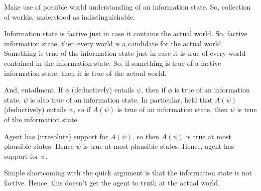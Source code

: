 \documentclass[10pt]{article}
\begin{document}
\begin{note}
  Make use of possible world understanding of an information state.
  So, collection of worlds, understood as indistinguishable.

  Information state is factive just in case it contains the actual world.
  So, factive information state, then every world is a candidate for the actual world.
  Something is true of the information state just in case it is true of every world contained in the information state.
  So, if something is true of a factive information state, then it is true of the actual world.

  And, entailment.
  If \(\phi\) (deductively) entails \(\psi\), then if \(\phi\) is true of an information state, \(\psi\) is also true of an information state.
  In particular, held that \(A(\psi)\) (deductively) entails \(\psi\), so if \(A(\psi)\) is true of an information state, then \(\psi\) is true of the information state.
\end{note}

\begin{note}
  Agent has (irresolute) support for \(A(\psi)\), so then \(A(\psi)\) is true at most plausible states.
  Hence \(\psi\) is true at most plausible states.
  Hence, agent has support for \(\psi\).
\end{note}

\begin{note}
  Simple shortcoming with the quick argument is that the information state is not factive.
  Hence, this doesn't get the agent to truth at the actual world.
\end{note}
\end{document}
